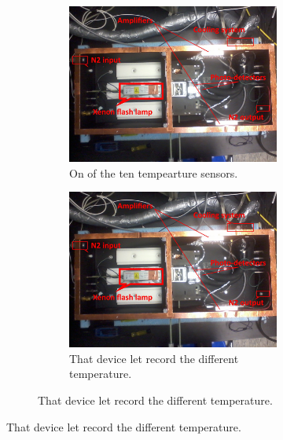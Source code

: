 \begin{figure}[!hbtp]
  \begin{figure}[!hbtp]
  \centering
  \begin{subfigure}{.5\textwidth}
    \includegraphics[totalheight=.35\textwidth,trim=0cm 7cm 0cm 2.5cm, clip=true,]{../Pictures/blabla/box.jpg}%
    \caption{On of the ten tempearture sensors.}
    \label{fig:beam_splitter}
  \end{subfigure}%
  \begin{subfigure}{.5\textwidth}
    \includegraphics[totalheight=.35\textwidth,trim=0cm 7cm 0cm 2.5cm, clip=true,]{../Pictures/blabla/box.jpg}
    \caption{That device let record the different temperature.}
    \label{fig:filters}
  \end{subfigure}
  \end{figure}
  

\end{figure}
